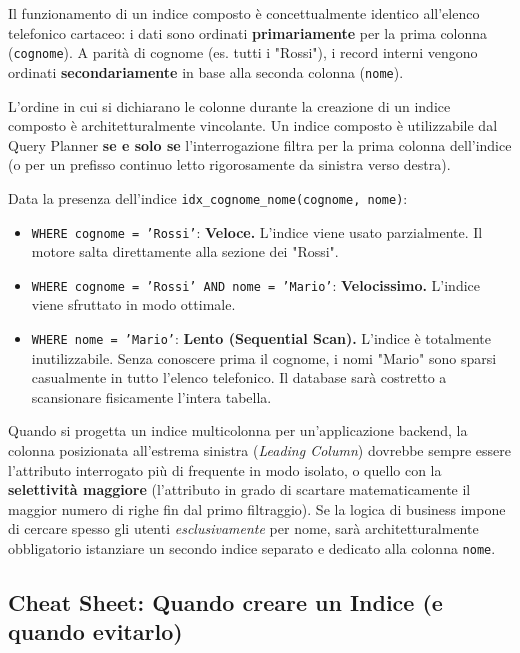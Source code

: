 Il funzionamento di un indice composto è concettualmente identico all'elenco telefonico cartaceo: i dati sono ordinati \textbf{primariamente} per la prima colonna (\texttt{cognome}). A parità di cognome (es. tutti i "Rossi"), i record interni vengono ordinati \textbf{secondariamente} in base alla seconda colonna (\texttt{nome}).

\begin{warningbox}
L'ordine in cui si dichiarano le colonne durante la creazione di un indice composto è architetturalmente vincolante. Un indice composto è utilizzabile dal Query Planner \textbf{se e solo se} l'interrogazione filtra per la prima colonna dell'indice (o per un prefisso continuo letto rigorosamente da sinistra verso destra).

Data la presenza dell'indice \texttt{idx\_cognome\_nome(cognome, nome)}:
\begin{itemize}
    \item \texttt{WHERE cognome = 'Rossi'}: \textbf{Veloce.} L'indice viene usato parzialmente. Il motore salta direttamente alla sezione dei "Rossi".
    \item \texttt{WHERE cognome = 'Rossi' AND nome = 'Mario'}: \textbf{Velocissimo.} L'indice viene sfruttato in modo ottimale.
    \item \texttt{WHERE nome = 'Mario'}: \textbf{Lento (Sequential Scan).} L'indice è totalmente inutilizzabile. Senza conoscere prima il cognome, i nomi "Mario" sono sparsi casualmente in tutto l'elenco telefonico. Il database sarà costretto a scansionare fisicamente l'intera tabella.
\end{itemize}
\end{warningbox}

\begin{bestpractice}
Quando si progetta un indice multicolonna per un'applicazione backend, la colonna posizionata all'estrema sinistra (\textit{Leading Column}) dovrebbe sempre essere l'attributo interrogato più di frequente in modo isolato, o quello con la \textbf{selettività maggiore} (l'attributo in grado di scartare matematicamente il maggior numero di righe fin dal primo filtraggio). Se la logica di business impone di cercare spesso gli utenti \textit{esclusivamente} per nome, sarà architetturalmente obbligatorio istanziare un secondo indice separato e dedicato alla colonna \texttt{nome}.
\end{bestpractice}

\subsection{Cheat Sheet: Quando creare un Indice (e quando evitarlo)}

